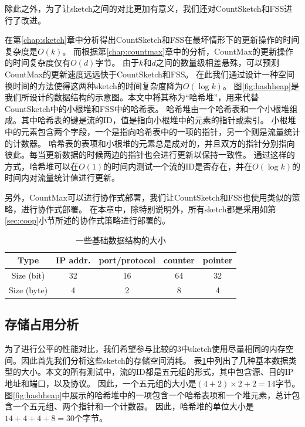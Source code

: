 除此之外，为了让sketch之间的对比更加有意义，我们还对CountSketch和FSS进行了改进。

在第\ref{chap:sketch}章中分析得出CountSketch和FSS在最坏情形下的更新操作的时间复杂度是$O(k)$。
而根据第\ref{chap:countmax}章中的分析，CountMax的更新操作的时间复杂度仅有$O(d)$字节。
由于$k$和$d$之间的数量级相差悬殊，可以预测CountMax的更新速度远远快于CountSketch和FSS。
在此我们通过设计一种空间换时间的方法使得这两种sketch的时间复杂度降为$O(\log{k})$。
图\ref{fig:hashheap}是我们所设计的数据结构的示意图。本文中将其称为“哈希堆”，用来代替CountSketch中的小根堆和FSS中的哈希表。
哈希堆由一个哈希表和一个小根堆组成。其中哈希表的键是流的ID，值是指向小根堆中的元素的指针或索引。
小根堆中的元素包含两个字段，一个是指向哈希表中的一项的指针，另一个则是流量统计的计数器。
哈希表的表项和小根堆的元素总是成对的，并且双方的指针分别指向彼此。每当更新数据的时候两边的指针也会进行更新以保持一致性。
通过这样的方式，哈希堆可以在$O(1)$的时间内测试一个流的ID是否存在，并在$O(\log{k})$的时间内对流量统计值进行更新。

另外，CountMax可以进行协作式部署，我们让CountSketch和FSS也使用类似的策略，进行协作式部署。
在本章中，除特别说明外，所有sketch都是采用如第\ref{sec:coop}小节所述的协作式策略进行部署的。

\begin{table}[h]
	\centering
    \caption{\textnormal{一些基础数据结构的大小}}
	\begin{tabular}{c|c|c|c|c}
		\hline
		Type & IP addr. & port/protocol & counter &pointer\\
		\hline
		Size (bit) & 32 & 16 & 64 & 32\\
		\hline
		Size (byte) & 4 & 2 & 8 & 4\\
		\hline
	\end{tabular}
    \label{tbl:datasize}
\end{table}


\subsection{存储占用分析}\label{subsec:memory}

为了进行公平的性能对比，我们希望参与比较的3中sketch使用尽量相同的内存空间。因此首先我们分析这些sketch的存储空间消耗。
表\ref{tbl:datasize}中列出了几种基本数据类型的大小。本文的所有测试中，流的ID都是五元组的形式，其中包含源、目的IP地址和端口，以及协议。
因此，一个五元组的大小是$ (4 + 2 ) \times 2 + 2=14$字节。
图\ref{fig:hashheap}中展示的哈希堆中的一项包含一个哈希表项和一个堆元素，总计包含一个五元组、两个指针和一个计数器。
因此，哈希堆的单位大小是$14+4+4+8=30$个字节。

